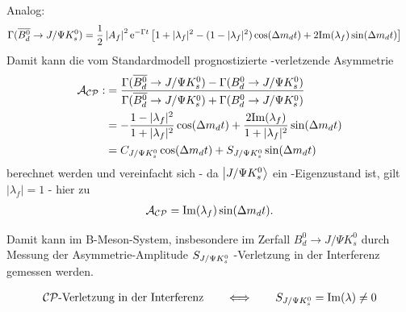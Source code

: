 Analog:
\begin{align}
\Gamma (\text{$\overline{B_d^0}$} \rightarrow J/\Psi K_s^0) &= \frac{1}{2} \left|A_f\right|^2\mathrm{e}^{-\Gamma t} \left[1+|\lambda_f|^2 -(1-|\lambda_f|^2)\cos(\Delta m_d t) + 2\mathrm{Im}(\lambda_f)\sin(\Delta m_d t)\right] \label{eq:bdbar}
\end{align}
Damit kann die vom Standardmodell prognostizierte \CP-verletzende Asymmetrie 
\begin{align}
\mathcal{A}_{\text{$\mathcal{CP}$}} :&= \frac{\Gamma (\text{$\overline{B_d^0}$} \rightarrow J/\Psi K_s^0) - \Gamma (\text{$B_d^0$} \rightarrow J/\Psi K_s^0)}{\Gamma (\text{$\overline{B_d^0}$} \rightarrow J/\Psi K_s^0) + \Gamma (\text{$B_d^0$} \rightarrow J/\Psi K_s^0)} \label{eq:cp_asymm_def}\\
&= -\frac{1-|\lambda_f|^2}{1+|\lambda_f|^2}\cos(\Delta m_d t) + \frac{2\mathrm{Im}(\lambda_f)}{1+|\lambda_f|^2}\sin(\Delta m_d t) \\
&= C_{J/\Psi K_s^0} \cos(\Delta m_d t) + S_{J/\Psi K_s^0} \sin(\Delta m_d t) \label{eq:cp_asymm}
\end{align}
berechnet werden und vereinfacht sich - da $\Ket{J/\Psi K_s^0}$ ein \CP-Eigenzustand ist, gilt $|\lambda_f| = 1$ - hier zu
\begin{align}
\mathcal{A}_{\text{$\mathcal{CP}$}} = \mathrm{Im}(\lambda_f)\sin(\Delta m_d t) .
\end{align}

Damit kann im B-Meson-System, insbesondere im Zerfall $B_d^0 \rightarrow J/\Psi K_s^0$ durch Messung der Asymmetrie-Amplitude $S_{J/\Psi K_s^0}$ \CP-Verletzung in der Interferenz gemessen werden.

\begin{align}
\text{$\mathcal{CP}$-Verletzung in der Interferenz} \qquad \Longleftrightarrow \qquad S_{J/\Psi K_s^0} = \mathrm{Im}(\lambda)\neq 0
\end{align}

